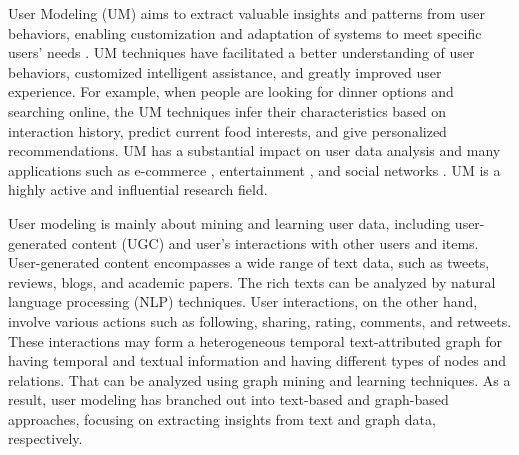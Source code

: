 \documentclass[11pt]{article}
\begin{document}
User Modeling (UM) aims to extract valuable insights and patterns from user behaviors, enabling customization and adaptation of systems to meet specific users' needs \cite{li2021survey}. UM techniques have facilitated a better understanding of user behaviors, customized intelligent assistance, and greatly improved user experience. For example, when people are looking for dinner options and searching online, the UM techniques infer their characteristics based on interaction history, predict current food interests, and give personalized recommendations. UM has a substantial impact on user data analysis and many applications such as e-commerce \cite{schafer2001commerce,zhao2015commerce, sarwar2000analysis}, entertainment \cite{berkovsky2005entertainment, christensen2011entertainment, natkin2006user}, and social networks \cite{abel2011analyzing, tao2012tums, abel2013twitter}. UM is a highly active and influential research field.


User modeling is mainly about mining and learning user data, including user-generated content (UGC) and user's interactions with other users and items.
User-generated content encompasses a wide range of text data, such as tweets, reviews, blogs, and academic papers. The rich texts can be analyzed by natural language processing (NLP) techniques. User interactions, on the other hand, involve various actions such as following, sharing, rating, comments, and retweets. These interactions may form a heterogeneous temporal text-attributed graph \cite{shi2016survey} for having temporal and textual information and having different types of nodes and relations. That can be analyzed using graph mining and learning techniques. As a result, user modeling has branched out into text-based and graph-based approaches, focusing on extracting insights from text and graph data, respectively.
\end{document}

